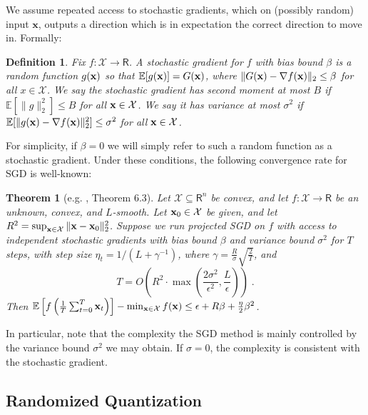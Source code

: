 \documentclass{article}
\newcommand{\R}{\mathsf{R}}
\renewcommand{\vec}[1]{\mathbf{#1}}
\def\x{{\bf x}}
\def\E{\mathbb{E}}
\newtheorem{theorem}{Theorem}
\newtheorem{definition}{Definition}
\begin{document}
We assume repeated access to stochastic gradients, which on (possibly random) input $\vec{x}$, outputs a direction which is in expectation the correct direction to move in.
Formally:
\begin{definition}
Fix $f: \mathcal{X} \to \R$.
A \emph{stochastic gradient} for $f$ with bias bound $\beta$ is a random function $g (\x)$ so that $\E [g (\x) ] = G( \x)$, where $\| G(\x) - \nabla f(\x) \|_2 \leq \beta$ for all $x \in \mathcal{X}$.
We say the stochastic gradient has second moment at most $B$ if $\E [\| g \|_2^2] \leq B$ for all $\x \in \mathcal{X}$.
We say it has variance at most $\sigma^2$ if $\E [\| g (\x) - \nabla f(\x) \|_2^2] \leq \sigma^2$ for all $\x \in \mathcal{X}$. 
\end{definition}

For simplicity, if $\beta = 0$ we will simply refer to such a random function as a stochastic gradient.
Under these conditions, the following convergence rate for SGD is well-known:

\begin{theorem}[e.g. \cite{2014arXiv1405.4980B}, Theorem 6.3]
\label{thm:sgd}
Let $\mathcal{X} \subseteq \R^n$ be convex, and let $f: \mathcal{X} \to \R$ be an unknown, convex, and $L$-smooth.
Let $\x_0 \in \mathcal{X}$ be given, and let $R^2 = \sup_{\x \in \mathcal{X}} \| \x - \x_0 \|_2^2$.
Suppose we run projected SGD on $f$ with access to independent stochastic gradients with bias bound $\beta$ and variance bound $\sigma^2$ for $T$ steps, with step size $\eta_t = 1 / ( L + \gamma^{-1})$, where $\gamma = \frac{R}{\sigma} \sqrt{\frac{2}{T}}$, and
\begin{equation}
\label{eq:sgd-conv}
T = O \left( R^2 \cdot \max \left( \frac{2 \sigma^2}{\epsilon^2} , \frac{L}{\epsilon} \right) \right) \; .
\end{equation}
Then $\E \left[ f \left( \frac{1}{T} \sum_{t = 0}^T \x_t \right) \right] - \min_{\x \in \mathcal{X}} f(\x) \leq \epsilon + R \beta + \frac{\eta}{2} \beta^2$.
\end{theorem} 

In particular, note that the complexity the SGD method is mainly controlled by the variance bound $\sigma^2$ we may obtain. If $\sigma = 0$, the complexity is consistent with the stochastic gradient.


\subsection{Randomized Quantization}
\end{document}
